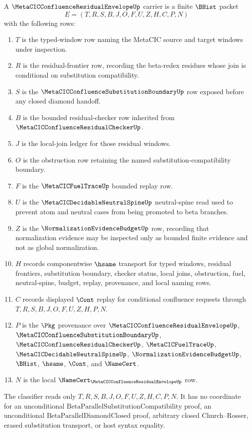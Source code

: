 \begin{definition}
\label{def:metacic-confluence-residual-envelope-carrier}
A $\MetaCICConfluenceResidualEnvelopeUp$ carrier is a finite $\BHist$ packet
$$
E=(T,R,S,B,J,O,F,U,Z,H,C,P,N)
$$
with the following rows:
\begin{enumerate}
\item $T$ is the typed-window row naming the MetaCIC source and target windows under inspection.
\item $R$ is the residual-frontier row, recording the beta-redex residues whose join is conditional on substitution compatibility.
\item $S$ is the $\MetaCICConfluenceSubstitutionBoundaryUp$ row exposed before any closed diamond handoff.
\item $B$ is the bounded residual-checker row inherited from $\MetaCICConfluenceResidualCheckerUp$.
\item $J$ is the local-join ledger for those residual windows.
\item $O$ is the obstruction row retaining the named substitution-compatibility boundary.
\item $F$ is the $\MetaCICFuelTraceUp$ bounded replay row.
\item $U$ is the $\MetaCICDecidableNeutralSpineUp$ neutral-spine read used to prevent atom and neutral cases from being promoted to beta branches.
\item $Z$ is the $\NormalizationEvidenceBudgetUp$ row, recording that normalization evidence may be inspected only as bounded finite evidence and not as global normalization.
\item $H$ records componentwise $\hsame$ transport for typed windows, residual frontiers, substitution boundary, checker status, local joins, obstruction, fuel, neutral-spine, budget, replay, provenance, and local naming rows.
\item $C$ records displayed $\Cont$ replay for conditional confluence requests through $T,R,S,B,J,O,F,U,Z,H,P,N$.
\item $P$ is the $\Pkg$ provenance over $\MetaCICConfluenceResidualEnvelopeUp$, $\MetaCICConfluenceSubstitutionBoundaryUp$, $\MetaCICConfluenceResidualCheckerUp$, $\MetaCICFuelTraceUp$, $\MetaCICDecidableNeutralSpineUp$, $\NormalizationEvidenceBudgetUp$, $\BHist$, $\hsame$, $\Cont$, and $\NameCert$.
\item $N$ is the local $\NameCert_{\MetaCICConfluenceResidualEnvelopeUp}$ row.
\end{enumerate}
The classifier reads only $T,R,S,B,J,O,F,U,Z,H,C,P,N$. It has no coordinate for an unconditional $\mathrm{BetaParallelSubstitutionCompatibility}$ proof, an unconditional $\mathrm{BetaParallelDiamondClosed}$ proof, arbitrary closed Church--Rosser, erased substitution transport, or host syntax equality.
\end{definition}


